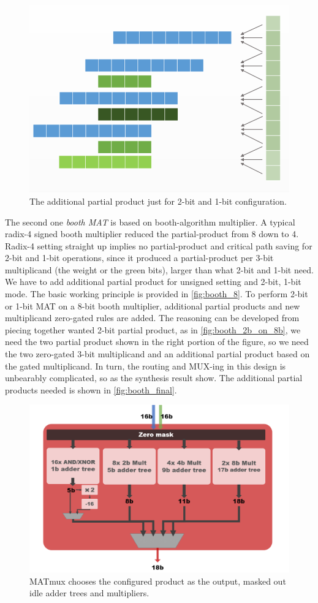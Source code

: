 \begin{figure}[t]
    \centering
    \includegraphics[width=0.8\linewidth]{inc/4_proposed_architecture/figure/booth_final.png}
    \caption{The additional partial product just for 2-bit and 1-bit configuration.}
    \label{fig:booth_final}
\end{figure}
The second one \textit{booth MAT} is based on booth-algorithm multiplier. A typical radix-4 signed booth multiplier reduced the partial-product from 8 down to 4. Radix-4 setting straight up implies no partial-product and critical path saving for 2-bit and 1-bit operations, since it produced a partial-product per 3-bit multiplicand (the weight or the green bits), larger than what 2-bit and 1-bit need. We have to add additional partial product for unsigned setting and 2-bit, 1-bit mode. The basic working principle is provided in \autoref{fig:booth_8}. To perform 2-bit or 1-bit MAT on a 8-bit booth multiplier, additional partial products and new multiplicand zero-gated rules are added. The reasoning can be developed from piecing together wanted 2-bit partial product, as in \autoref{fig:booth_2b_on_8b}, we need the two partial product shown in the right portion of the figure, so we need the two zero-gated 3-bit multiplicand and an additional partial product based on the gated multiplicand. In turn, the routing and MUX-ing in this design is unbearably complicated, so as the synthesis result show. The additional partial products needed is shown in \autoref{fig:booth_final}. \\
\begin{figure}[h!]
    \centering
    \includegraphics[width=0.9\linewidth]{inc/4_proposed_architecture/figure/MATmux.png}
    \caption{MATmux chooses the configured product as the output, masked out idle adder trees and multipliers.}
    \label{fig:MATmux}
\end{figure}
